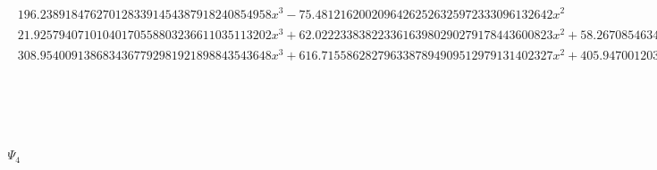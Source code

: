 \documentclass{article}
\begin{document}
\begin{landscape}
\begin{eqnarray*}
\begin{array}{cc}
\begin{array}{cc}
 196.2389184762701283391454387918240854958 x^3-75.48121620020964262526325972333096132642 x^2 & x\geq -\frac{1}{8}\land x<0 \\
 21.92579407101040170558803236611035113202 x^3+62.02223383822336163980290279178443600823 x^2+58.26708546341551816284170848523781862038 x+18.17064569620255822862683805956373374418 & x\geq -1\land x<-\frac{3}{4} \\
 308.9540091386834367792981921898843543648 x^3+616.7155862827963387894909512979131402327 x^2+405.9470012035767372004878865418122445018 x+88.00559998292573453188341799295181464278 & x\geq -\frac{3}{4}\land x<-\frac{1}{2}
\end{array}

\end{array}\\
\Psi_4 & = & \begin{array}{cc}
 \{ & 
\begin{array}{cc}
 10386.36232407685580000294925657534170405 x^3-10238.86028444780174053700022164502617660 x^2+3302.619797836833544379857982977844033657 x-347.0994470453957442081763875750821561467 & x\geq \frac{1}{4}\land x<\frac{3}{8} \\
 1188.519414545855891834357305903018647792 x^3-1502.178033985077390453883200479738326339 x^2+630.4480874481808680761449462937644353220 x-88.58849993867277904239423877118512454367 & x\geq \frac{3}{8}\land x<\frac{1}{2} \\
 323.2433320192816225285876866878939745187 x^2-2587.717828868952375871326416212072187618 x^3 & x\geq 0\land x<\frac{1}{8} \\
 4830.109876107684086970272104429790513404 x^3-2032.452678907552804525848611337057543657 x^2+241.2133290609287725679091438511505654336 x-7.831860698166801739750572935382591295633 & x\geq \frac{1}{8}\land x<\frac{1}{4} \\
 332.9498332672091292556337436516651699791 x^3-657.9566039433909632015833272748637869210 x^2+427.9038433654795127578877447774050042640 x-91.42553774791286287400016103280485914247 & \left(x\geq \frac{1}{2}\land x<\frac{5}{8}\right)\lor \left(x\geq \frac{5}{8}\land x<\frac{3}{4}\right) \\
 27.86414127926598336574062026829373122068 x^3-78.78693303569015348385852075885964089872 x^2+73.98144223358235687049518071283808813540 x-23.05865047715818675237728022227217845736 & \left(x\geq \frac{3}{4}\land x<\frac{7}{8}\right)\lor \left(x\geq \frac{7}{8}\land x<1\right) \\
 -643.6254455784804309827024927364052286633 x^3-771.7418410646374213349755106212104108394 x^2-298.0131918439317745596764765080918740763 x-36.78247866753829343306896297171299873756 & x\geq -\frac{1}{2}\land x<-\frac{3}{8} \\

\end{array}
\end{array}
\end{eqnarray*}
\end{landscape}
\end{document}
